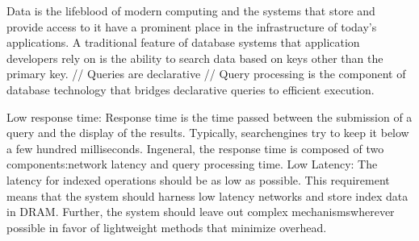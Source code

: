 Data is the lifeblood of modern computing and the systems that store and provide access to it have a prominent place in the infrastructure of today's applications.
A traditional feature of database systems that application developers rely on is the ability to search data based on keys other than the primary key.
// Queries are declarative //
Query processing is the component of database technology that bridges declarative queries to efficient execution.


Low response time:
Response time is the time passed between the submission of a query and the display of the results.
Typically, searchengines try to keep it below a few hundred milliseconds. Ingeneral, the response time is composed of two components:network latency and query processing time.
Low Latency: The latency for indexed operations should be as low as possible. 
This requirement  means  that  the  system  should  harness  low  latency  networks  and  store index  data  in  DRAM.  Further,  the  system  should  leave  out  complex  mechanismswherever possible in favor of lightweight methods that minimize overhead.


